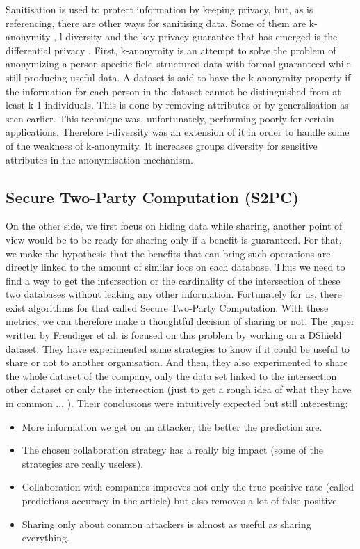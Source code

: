 \documentclass{eplmastersthesis}
\begin{document}
Sanitisation is used to protect information by keeping privacy, but, as \cite{mohaisen2017rethinking} is referencing, there are other ways for sanitising data. Some of them are k-anonymity \cite{sweeney2002k}, l-diversity \cite{machanavajjhala2007diversity} and the key privacy guarantee that has emerged is the differential privacy \cite{dwork2008differential}.
First, k-anonymity is an attempt to solve the problem of anonymizing a person-specific field-structured data with formal guaranteed while still producing useful data. A dataset is said to have the k-anonymity property if the information for each person in the dataset cannot be distinguished from at least k-1 individuals. This is done by removing attributes or by generalisation as seen earlier. This technique was, unfortunately, performing poorly for certain applications. Therefore l-diversity was an extension of it in order to handle some of the weakness of k-anonymity. It increases groups diversity for sensitive attributes in the anonymisation mechanism.\\

\subsection{Secure Two-Party Computation (S2PC)}
On the other side, we first focus on hiding data while sharing, another point of view would be to be ready for sharing only if a benefit is guaranteed. For that, we make the hypothesis that the benefits that can bring such operations are directly linked to the amount of similar \glspl{ioc} on each database.
Thus we need to find a way to get the intersection or the cardinality of the intersection of these two databases without leaking any other information. Fortunately for us, there exist algorithms for that called Secure Two-Party Computation.
With these metrics, we can therefore make a thoughtful decision of sharing or not.
The paper written by Freudiger et al.\cite{freudiger2015controlled} is focused on this problem by working on a DShield dataset. They have experimented some strategies to know if it could be useful to share or not to another organisation. And then, they also experimented to share the whole dataset of the company, only the data set linked to the intersection other dataset or only the intersection (just to get a rough idea of what they have in common ... ).
Their conclusions were intuitively expected but still interesting:
\begin{itemize}
\item More information we get on an attacker, the better the prediction are.
\item The chosen collaboration strategy has a really big impact (some of the strategies are really useless).
\item Collaboration with companies improves not only the true positive rate (called predictions accuracy in the article) but also removes a lot of false positive.
\item Sharing only about common attackers is almost as useful as sharing everything.
\end{itemize}
\end{document}
